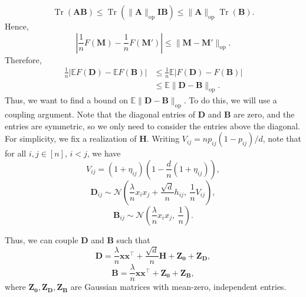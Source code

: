 \documentclass[11pt, titlepage]{article} %
\numberwithin{equation}{section}
\theoremstyle{definition}
\numberwithin{theorem}{section}
\numberwithin{lemma}{section}
\numberwithin{corollary}{section}
\numberwithin{proposition}{section}
\numberwithin{definition}{section}
\numberwithin{remark}{section}
\begin{document}
\[
\operatorname{Tr}(\bm{A}\bm{B}) \leq \operatorname{Tr}(\|\bm{A}\|_{\mathrm{op}} \bm{I} \bm{B})
\leq \|\bm{A}\|_{\mathrm{op}} \operatorname{Tr}(\bm{B}).
\]
Hence,
\[
\left| \frac{1}{n}F(\bm{M}) - \frac{1}{n}F(\bm{M}')\right| 
\leq \|\bm{M} - \bm{M}'\|_{\mathrm{op}}.
\]
Therefore,
\begin{align*}
\frac{1}{n} \left|\mathbb{E}F(\bm{D}) - \mathbb{E}F(\bm{B})\right|
&\leq \frac{1}{n} \mathbb{E} \left|F(\bm{D}) - F(\bm{B})\right|\\
&\leq \mathbb{E} \|\bm{D} - \bm{B}\|_{\mathrm{op}}.
\end{align*}
Thus, we want to find a bound on $\mathbb{E} \|\bm{D} - \bm{B}\|_{\mathrm{op}}$. To do this,
we will use a coupling argument. Note that the diagonal entries of $\bm{D}$ and $\bm{B}$ are zero, 
and the entries are symmetric, so we only need to consider the entries above the diagonal.
For simplicity, we fix a realization of $\bm{H}$. Writing $V_{ij} = n p_{ij} (1 - p_{ij}) / d$, 
note that for all $i, j \in [n]$, $i < j$, we have
\[
V_{ij} = (1 + \eta_{ij})\left(1 - \frac{d}{n}(1 + \eta_{ij})\right),
\]
\[
\bm{D}_{ij} \sim \mathcal{N}\left(
\frac{\lambda}{n} x_i x_j + \frac{\sqrt{d}}{n} h_{ij}, \ \frac{1}{n}V_{ij}\right),
\]
\[
\bm{B}_{ij} \sim \mathcal{N}\left(
\frac{\lambda}{n} x_i x_j, \ \frac{1}{n}\right).
\]
 
Thus, we can couple $\bm{D}$ and $\bm{B}$ such that
\[
\bm{D} = \frac{\lambda}{n} \bm{x} \bm{x}^\top + \frac{\sqrt{d}}{n} \bm{H} 
+ \bm{Z_0} + \bm{Z_D},
\]
\[
\bm{B} = \frac{\lambda}{n} \bm{x} \bm{x}^\top + \bm{Z_0} + \bm{Z_B},
\]
where $\bm{Z_0}, \bm{Z_D}, \bm{Z_B}$ are Gaussian matrices with mean-zero, independent entries.
\end{document}
